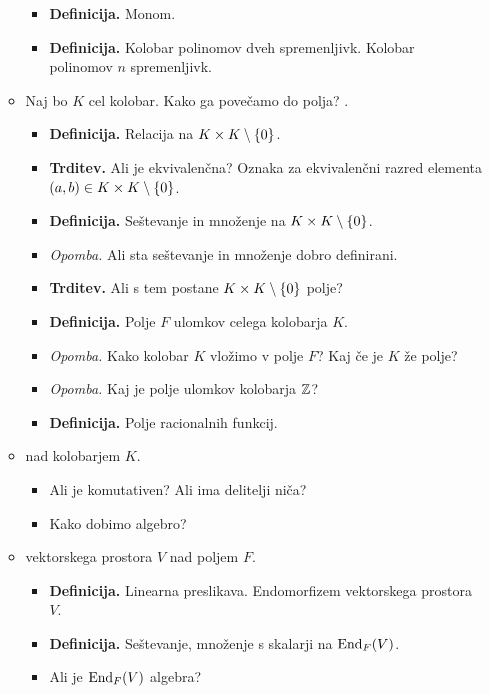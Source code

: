 \begin{enumerate}
\begin{itemize}
\begin{itemize}
            \item \colorbox{purple!30}{\textbf{Definicija.}} Monom.
            \item \colorbox{purple!30}{\textbf{Definicija.}} Kolobar polinomov dveh spremenljivk. Kolobar polinomov $n$ spremenljivk.
        \end{itemize}
        \item Naj bo $K$ cel kolobar. Kako ga povečamo do polja? .
        \begin{itemize}
            \item \colorbox{purple!30}{\textbf{Definicija.}} Relacija na $K \times K \setminus \left\{0\right\}$.
            \item \colorbox{blue!30}{\textbf{Trditev.}} Ali je ekvivalenčna? Oznaka za ekvivalenčni razred elementa $(a,b) \in K \times K \setminus \left\{0\right\}$.
            \item \colorbox{purple!30}{\textbf{Definicija.}} Seštevanje in množenje na $K \times K \setminus \left\{0\right\}$.
            \item \colorbox{yellow!30}{\emph{Opomba.}} Ali sta seštevanje in množenje dobro definirani.
            \item \colorbox{blue!30}{\textbf{Trditev.}} Ali s tem postane $K \times K \setminus \left\{0\right\}$ polje?
            \item \colorbox{purple!30}{\textbf{Definicija.}} Polje $F$ ulomkov celega kolobarja $K$.
            \item \colorbox{yellow!30}{\emph{Opomba.}} Kako kolobar $K$ vložimo v polje $F$? Kaj če je $K$ že polje?
            \item \colorbox{yellow!30}{\emph{Opomba.}} Kaj je polje ulomkov kolobarja $\mathbb{Z}$?
            \item \colorbox{purple!30}{\textbf{Definicija.}} Polje racionalnih funkcij.
        \end{itemize}

        \item {} nad kolobarjem $K$.
        \begin{itemize}
            \item Ali je komutativen? Ali ima delitelji niča?
            \item Kako dobimo algebro?
        \end{itemize}

        \newpage
        \item {} vektorskega prostora $V$ nad poljem $F$.
        \begin{itemize}
            \item \colorbox{purple!30}{\textbf{Definicija.}} Linearna preslikava. Endomorfizem vektorskega prostora $V$.
            \item \colorbox{purple!30}{\textbf{Definicija.}} Seštevanje, množenje s skalarji na $\operatorname{End}_F (V)$.
            \item Ali je $\operatorname{End}_F (V)$ algebra?
        \end{itemize}


\end{itemize}
\end{enumerate}
